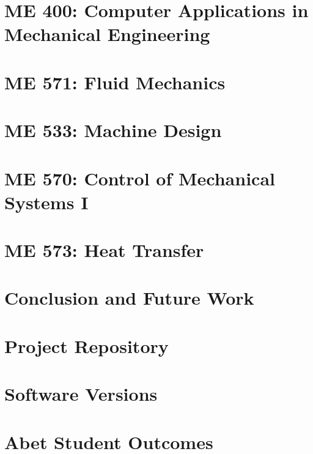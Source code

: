 \documentclass[12pt]{report}
\begin{document}
    \clearpage
    \chapter{ME 400: Computer Applications in Mechanical Engineering}
    
    
    \clearpage
    \chapter{ME 571: Fluid Mechanics}
    

    \clearpage
    \chapter{ME 533: Machine Design}
    

    \clearpage
    \chapter{ME 570: Control of Mechanical Systems I}
    

    \clearpage
    \chapter{ME 573: Heat Transfer}
    
    
    \clearpage
    \chapter{Conclusion and Future Work}
    

    \clearpage
    \appendix
    \chapter{Project Repository}
    \label{appendix:appendix_github}
    

    \clearpage
    \chapter{Software Versions}
    \label{appendix:appendix_versions}
    

    \chapter{Abet Student Outcomes}
    \label{appendix:appendix_abet}
    
\end{document}
